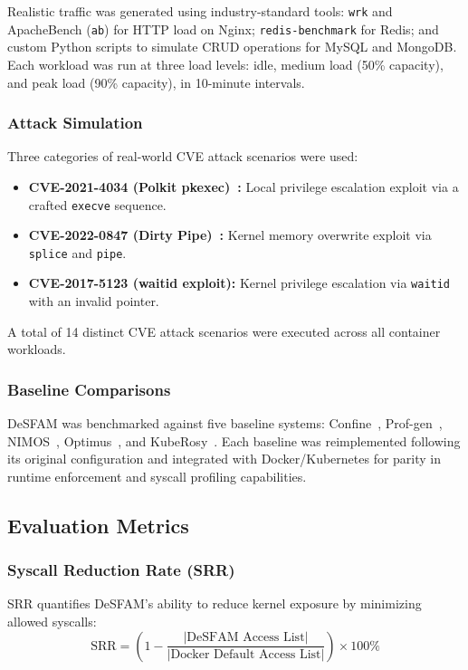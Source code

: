 Realistic traffic was generated using industry-standard tools: \texttt{wrk} and ApacheBench
(\texttt{ab}) for HTTP load on Nginx; \texttt{redis-benchmark} for Redis; and custom Python
scripts to simulate CRUD operations for MySQL and MongoDB. Each workload was run at three load
levels: idle, medium load (50\% capacity), and peak load (90\% capacity), in 10-minute
intervals.

\subsubsection{Attack Simulation}
\label{subsubsec:attack_simulation}

Three categories of real-world CVE attack scenarios were used:
\begin{itemize}
  \item \textbf{CVE-2021-4034 (Polkit pkexec)~\cite{cve_2021_4034}:} Local privilege escalation
        exploit via a crafted \texttt{execve} sequence.
  \item \textbf{CVE-2022-0847 (Dirty Pipe)~\cite{cve_2022_0847}:} Kernel memory overwrite
        exploit via \texttt{splice} and \texttt{pipe}.
  \item \textbf{CVE-2017-5123 (waitid exploit):} Kernel privilege escalation via \texttt{waitid}
        with an invalid pointer.
\end{itemize}

A total of 14 distinct CVE attack scenarios were executed across all container workloads.

\subsubsection{Baseline Comparisons}
\label{subsubsec:baselines}

DeSFAM was benchmarked against five baseline systems: Confine~\cite{ref31_confine},
Prof-gen~\cite{ref36_profgen}, NIMOS~\cite{ref38_nimos}, Optimus~\cite{ref27_optimus}, and
KubeRosy~\cite{ref29_kuberosy}. Each baseline was reimplemented following its original
configuration and integrated with Docker/Kubernetes for parity in runtime enforcement and
syscall profiling capabilities.

\subsection{Evaluation Metrics}
\label{subsec:metrics}

\subsubsection{Syscall Reduction Rate (SRR)}
SRR quantifies DeSFAM's ability to reduce kernel exposure by minimizing allowed syscalls:
\begin{equation}
  \text{SRR} = \left(1 - \frac{|\text{DeSFAM Access List}|}{|\text{Docker Default Access List}|}\right) \times 100\%
  \label{eq:srr}
\end{equation}

